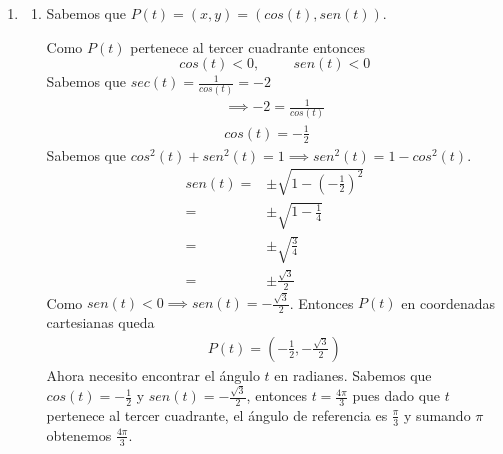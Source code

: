 \documentclass[12pt]{article}
\begin{document}
\begin{enumerate}
\begin{enumerate}
            En $x_2 \implies \frac{2}{3} (-1) + \frac{2}{3} = 0$.

            Por lo tanto los puntos donde la recta $L$ y la parábola se intersectan son $(2,2)$ y $(-1,0)$.
        
        \end{enumerate}
    \item \begin{enumerate}
            \item Sabemos que $P(t) = (x,y) = (cos(t), sen(t))$.
            
            Como $P(t)$ pertenece al tercer cuadrante entonces
            \begin{equation*}
                cos(t) < 0 , \hspace{1cm} sen(t)<0
            \end{equation*}
            Sabemos que $sec(t) = \frac{1}{cos(t)} = -2$ 
            \begin{gather*}
                \implies -2 = \frac{1}{cos(t)} \\
                cos(t) = -\frac{1}{2}
            \end{gather*}
            Sabemos que $cos^2(t)+sen^2(t)= 1 \implies sen^2(t) = 1 - cos^2(t)$.
            \begin{align*}
                sen(t)=& \pm \sqrt{1- (-\frac{1}{2})^{2}}\\ 
                =& \pm \sqrt{1-\frac{1}{4}} \\
                =& \pm \sqrt{\frac{3}{4}}\\ 
                =& \pm \frac{\sqrt{3}}{2}
            \end{align*}
            Como $sen(t) <0 \implies sen(t) = -\frac{\sqrt{3}}{2}$. 
            Entonces $P(t)$ en coordenadas cartesianas queda
            \begin{align*}
                P(t) = (-\frac{1}{2}, -\frac{\sqrt{3}}{2})
            \end{align*}
            Ahora necesito encontrar el ángulo $t$ en radianes. Sabemos que $cos(t) = -\frac{1}{2}$ y $sen(t) = -\frac{\sqrt{3}}{2}$, entonces $t = \frac{4\pi}{3}$ pues dado que $t$ pertenece al tercer cuadrante, el ángulo de referencia es $\frac{\pi}{3}$ y sumando $\pi$ obtenemos $\frac{4\pi}{3}$.
\begin{center}
\end{center}
\end{enumerate}
\end{enumerate}
\end{document}
